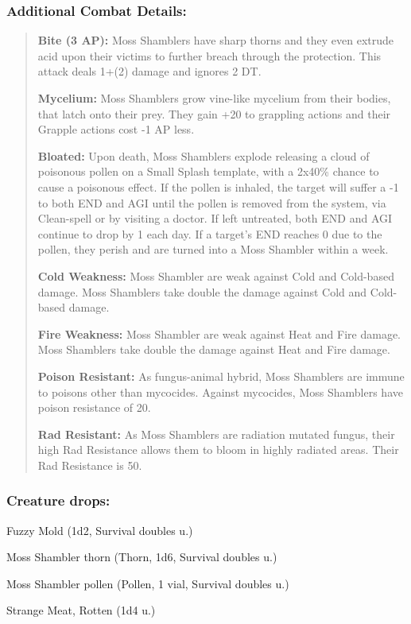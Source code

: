 \documentclass[11pt,a4paper,twocolumn]{book}
\begin{document}
	\subsubsection*{Additional Combat Details:}
	\begin{verse}
		\textbf{Bite (3 AP):} Moss Shamblers have sharp thorns and they even extrude acid upon their victims to further breach through the protection. This attack deals 1+(2) damage and ignores 2 DT.
		
		\textbf{Mycelium:} Moss Shamblers grow vine-like mycelium from their bodies, that latch onto their prey. They gain +20 to grappling actions and their Grapple actions cost -1 AP less.
		
		\textbf{Bloated:} Upon death, Moss Shamblers explode releasing a cloud of poisonous pollen on a Small Splash template, with a 2x40\%  chance to cause a poisonous effect. If the pollen is inhaled, the target will suffer a -1 to both END and AGI until the pollen is removed from the system, via Clean-spell or by visiting a doctor. If left untreated, both END and AGI continue to drop by 1 each day. If a target's END reaches 0 due to the pollen, they perish and are turned into a Moss Shambler within a week.
		
		\textbf{Cold Weakness:} Moss Shambler are weak against Cold and Cold-based damage. Moss Shamblers take double the damage against Cold and Cold-based damage.
		
		\textbf{Fire Weakness:} Moss Shambler are weak against Heat and Fire damage. Moss Shamblers take double the damage against Heat and Fire damage.
		
		\textbf{Poison Resistant:} As fungus-animal hybrid, Moss Shamblers are immune to poisons other than mycocides. Against mycocides, Moss Shamblers have poison resistance of 20.
		
		\textbf{Rad Resistant:} As Moss Shamblers are radiation mutated fungus, their high Rad Resistance allows them to bloom in highly radiated areas. Their Rad Resistance is 50.
	\end{verse}
	
	\subsubsection*{Creature drops:}
	\begin{compactitem}
		\item Fuzzy Mold (1d2, Survival doubles u.)
		\item Moss Shambler thorn (Thorn, 1d6, Survival doubles u.)
		\item Moss Shambler pollen (Pollen, 1 vial, Survival doubles u.)
		\item Strange Meat, Rotten (1d4 u.)
	\end{compactitem}
	
\end{document}

